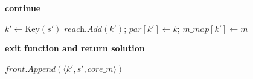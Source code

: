   \begin{algorithm}[H]
    \caption{BFS - Successor Processing}
    \begin{algorithmic}[1]
                 \textbf{continue} \EndIf
                
                \State $k' \gets \text{Key}(s')$
                    \State $\textit{reach.Add}(k')$; \quad $\textit{par}[k'] \gets k$; \quad $\textit{m\_map}[k'] \gets \textit{m}$
                    
                     
                        \State \textbf{exit function and return solution}
                    \EndIf
                    
                    \State $\textit{front.Append}(\langle k', s', \textit{core\_m} \rangle)$
                \EndIf
            \EndFor
        \EndFunction
    \end{algorithmic}
\end{algorithm}


